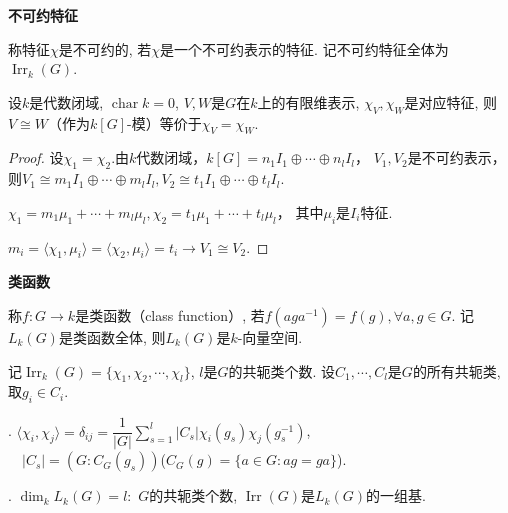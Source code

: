 \begin{definition} \textbf{不可约特征}\par
    \qquad 称特征$\chi$是不可约的, 若$\chi$是一个不可约表示的特征. 
    记不可约特征全体为$\operatorname{Irr}_k(G)$.
\end{definition}

\begin{proposition}
    设$k$是代数闭域, $\operatorname{char}k=0$, $V,W$是$G$在$k$上的有限维表示, 
    $\chi_V, \chi_W$是对应特征, 则$V\cong W$（作为$k[G]$-模）等价于$\chi_V=\chi_W$.
\end{proposition}
\begin{proof}
	设$\chi_1=\chi_2.$由$k$代数闭域，$k[G]=n_1I_1\oplus \cdots \oplus n_lI_l$，
    $V_1,V_2$是不可约表示，则$V_1\cong m_1I_1\oplus \cdots \oplus m_lI_l,
    V_2\cong t_1I_1\oplus \cdots \oplus t_lI_l$.
	
	$\chi_1=m_1\mu_1+\cdots+m_l\mu _l,\chi_2=t_1\mu_1+\cdots+t_l\mu _l$，
    其中$\mu _i$是$I_i$特征.
	
	$m_i=\langle \chi_1,\mu_i\rangle=\langle \chi_2,\mu_i\rangle=t_i\rightarrow V_1\cong V_2$.
\end{proof}
\begin{definition} \textbf{类函数}\par
    \qquad 称$f:G\rightarrow k$是类函数（class function）, 
    若$f(aga^{-1})=f(g), \forall a, g\in G$. 
    记$L_k(G)$是类函数全体, 则$L_k(G)$是$k$-向量空间.
\end{definition}

\begin{proposition}
    记$\operatorname{Irr}_k(G)=\{\chi_1,\chi_2,\cdots,\chi_l\}$, 
    $l$是$G$的共轭类个数. 设$C_1,\cdots,C_l$是$G$的所有共轭类, 取$g_i\in C_i$.\par
    . $\langle\chi_i,\chi_j\rangle=\delta_{ij}
    =\dfrac{1}{|G|}\sum\limits_{s=1}^l |C_s|\chi_i(g_s)\chi_j(g_s^{-1})$, \\
    \qquad\quad\ \ $|C_s|=(G:C_G(g_s))$($C_G(g)=\{a\in G:ag=ga\}$).\par
    . $\dim_k L_k(G)=l:$ $G$的共轭类个数, 
    $\operatorname{Irr}(G)$是$L_k(G)$的一组基.
\end{proposition}

